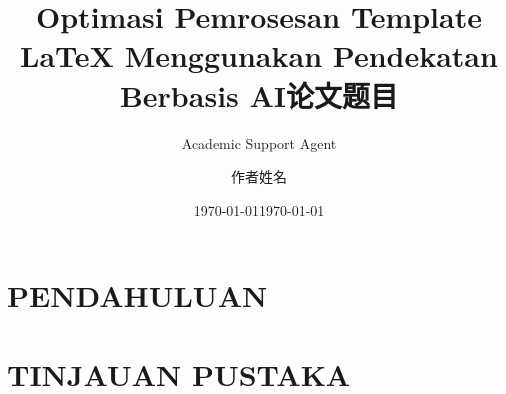 \documentclass{HustGraduPaper}
\title{Optimasi Pemrosesan Template LaTeX Menggunakan Pendekatan Berbasis AI}
\author{Academic Support Agent}
\date{\today}
\begin{document}
\maketitle

\begin{abstract}

\end{abstract}

\chapter{PENDAHULUAN}


\chapter{TINJAUAN PUSTAKA}


\title{论文题目} %
\author{作者姓名} %
\date{\today} %
\usepackage{xltxtra}
\usepackage{bm}
\end{document}
